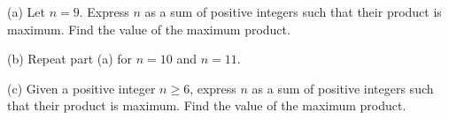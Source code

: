 (a) Let $n=9$. Express $n$ as a sum of positive integers such that their product is maximum. Find the value of the maximum product.

(b) Repeat part (a) for $n=10$ and $n=11$.

(c) Given a positive integer $n\geq6$, express $n$ as a sum of positive integers such that their product is maximum. Find the value of the maximum product.
